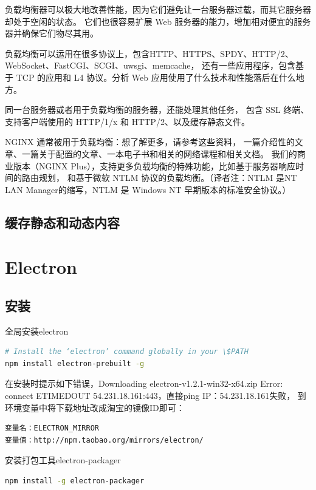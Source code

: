 \documentclass{book}
\begin{document}
负载均衡器可以极大地改善性能，因为它们避免让一台服务器过载，而其它服务器却处于空闲的状态。
它们也很容易扩展 Web 服务器的能力，增加相对便宜的服务器并确保它们物尽其用。

负载均衡可以运用在很多协议上，包含HTTP、HTTPS、SPDY、HTTP/2、WebSocket、FastCGI、SCGI、uwsgi、memcache，
还有一些应用程序，包含基于 TCP 的应用和 L4 协议。分析 Web 应用使用了什么技术和性能落后在什么地方。

同一台服务器或者用于负载均衡的服务器，还能处理其他任务，
包含 SSL 终端、支持客户端使用的 HTTP/1/x 和 HTTP/2、以及缓存静态文件。

NGINX 通常被用于负载均衡：想了解更多，请参考这些资料，
一篇介绍性的文章、一篇关于配置的文章、一本电子书和相关的网络课程和相关文档。
我们的商业版本（NGINX Plus），支持更多负载均衡的特殊功能，比如基于服务器响应时间的路由规划，
和基于微软 NTLM 协议的负载均衡。（译者注：NTLM 是NT LAN Manager的缩写，NTLM 是 Windows NT 早期版本的标准安全协议。）

\subsection{缓存静态和动态内容}

\section{Electron}

\subsection{安装}

全局安装electron

\begin{lstlisting}[language=Bash]
# Install the ‘electron’ command globally in your \$PATH
npm install electron-prebuilt -g
\end{lstlisting}

在安装时提示如下错误，Downloading electron-v1.2.1-win32-x64.zip
Error: connect ETIMEDOUT 54.231.18.161:443，直接ping IP：54.231.18.161失败，
到环境变量中将下载地址改成淘宝的镜像ID即可：

\begin{lstlisting}
变量名：ELECTRON_MIRROR
变量值：http://npm.taobao.org/mirrors/electron/
\end{lstlisting}

安装打包工具electron-packager

\begin{lstlisting}[language=Bash]
npm install -g electron-packager
\end{lstlisting}
\end{document}
